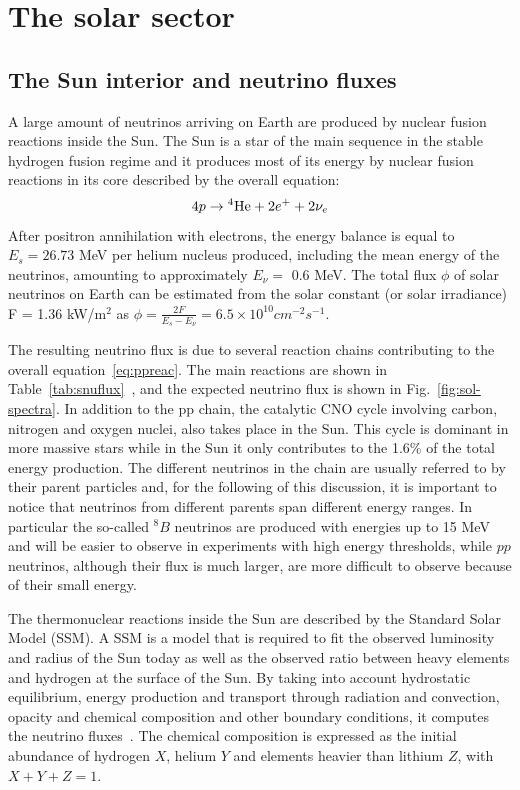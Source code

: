 \section{The solar sector}
\label{sec:solar}

\subsection{The Sun interior and neutrino fluxes}

A large amount of neutrinos arriving on Earth are produced by nuclear fusion reactions inside the Sun. 
The Sun is a star of the main sequence in the stable hydrogen fusion regime and it produces most of its energy by nuclear fusion reactions in its core described by the overall equation:
\begin{equation}
4p \rightarrow {}{^4}{\rm He} + 2 e^+ + 2 \nu_e
\label{eq:ppreac}
\end{equation}
After positron annihilation with electrons, the energy balance is equal to $E_s =26.73$ MeV per helium nucleus produced, including the mean energy of the neutrinos, amounting to approximately $E_\nu =$ 0.6 MeV. The total flux $\phi$ of solar neutrinos on Earth can be estimated from the solar constant (or solar irradiance) F = 1.36 kW/m$^2$  as
$\phi = \frac{2F}{E_s - E_\nu} = 6.5 \times 10^{10} cm^{-2} s^{-1}$.

The resulting neutrino flux is due to several reaction chains contributing to the overall equation~\ref{eq:ppreac}. The main reactions are shown in Table~\ref{tab:snuflux}~\cite{serenelli}, and the expected neutrino flux is shown in Fig.~\ref{fig:sol-spectra}. In addition to the pp chain, the catalytic CNO cycle involving carbon, nitrogen and oxygen nuclei, also takes place in the Sun. This cycle is dominant in more massive stars while in the Sun it only contributes to the 1.6\% of the total energy production. 
The different neutrinos in the chain are usually referred to by their parent particles  and, for the following of this discussion, it is important to notice that neutrinos from different parents span different energy ranges. In particular the so-called $^{8}B$ neutrinos are produced with energies up to 15 MeV and will be easier to observe in experiments with high energy thresholds, while $pp$ neutrinos, although their flux is much larger, are more difficult to observe because of their small energy.

The thermonuclear reactions inside the Sun are described by the Standard Solar Model (SSM). A SSM is a model that is required to fit the observed luminosity and radius of the Sun today as well as the observed ratio between heavy elements and hydrogen at the surface of the Sun. By taking into account hydrostatic equilibrium, energy production and transport through radiation and convection, opacity and chemical composition and other boundary conditions, it computes the neutrino fluxes~\cite{bahcall89}. 
The chemical composition is expressed as the initial abundance of hydrogen $X$, helium $Y$ and elements heavier than lithium $Z$, with $X+Y+Z = 1$.

